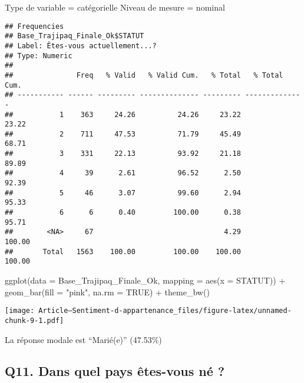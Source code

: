 \documentclass[
]{article}
\newenvironment{Shaded}{\begin{snugshade}}{\end{snugshade}}
\newcommand{\AttributeTok}[1]{\textcolor[rgb]{0.77,0.63,0.00}{#1}}
\newcommand{\ConstantTok}[1]{\textcolor[rgb]{0.00,0.00,0.00}{#1}}
\newcommand{\FunctionTok}[1]{\textcolor[rgb]{0.00,0.00,0.00}{#1}}
\newcommand{\NormalTok}[1]{#1}
\newcommand{\SpecialCharTok}[1]{\textcolor[rgb]{0.00,0.00,0.00}{#1}}
\newcommand{\StringTok}[1]{\textcolor[rgb]{0.31,0.60,0.02}{#1}}
\begin{document}
Type de variable = catégorielle Niveau de mesure = nominal

\begin{Shaded}
\end{Shaded}

\begin{verbatim}
## Frequencies  
## Base_Trajipaq_Finale_Ok$STATUT  
## Label: Êtes-vous actuellement...?  
## Type: Numeric  
## 
##               Freq   % Valid   % Valid Cum.   % Total   % Total Cum.
## ----------- ------ --------- -------------- --------- --------------
##           1    363     24.26          24.26     23.22          23.22
##           2    711     47.53          71.79     45.49          68.71
##           3    331     22.13          93.92     21.18          89.89
##           4     39      2.61          96.52      2.50          92.39
##           5     46      3.07          99.60      2.94          95.33
##           6      6      0.40         100.00      0.38          95.71
##        <NA>     67                               4.29         100.00
##       Total   1563    100.00         100.00    100.00         100.00
\end{verbatim}

\begin{Shaded}
\begin{Highlighting}[]
\FunctionTok{ggplot}\NormalTok{(}\AttributeTok{data =}\NormalTok{ Base\_Trajipaq\_Finale\_Ok, }\AttributeTok{mapping =} \FunctionTok{aes}\NormalTok{(}\AttributeTok{x =}\NormalTok{ STATUT)) }\SpecialCharTok{+}
  \FunctionTok{geom\_bar}\NormalTok{(}\AttributeTok{fill =} \StringTok{"pink"}\NormalTok{, }\AttributeTok{na.rm =} \ConstantTok{TRUE}\NormalTok{) }\SpecialCharTok{+}
  \FunctionTok{theme\_bw}\NormalTok{()}
\end{Highlighting}
\end{Shaded}

\texttt{[image: Article---Sentiment-d-appartenance\_files/figure-latex/unnamed-chunk-9-1.pdf]}

La réponse modale est ``Marié(e)'' (47.53\%)

\hypertarget{q11.-dans-quel-pays-uxeates-vous-nuxe9}{%
\subsection{Q11. Dans quel pays êtes-vous né
?}\label{q11.-dans-quel-pays-uxeates-vous-nuxe9}}
\end{document}
